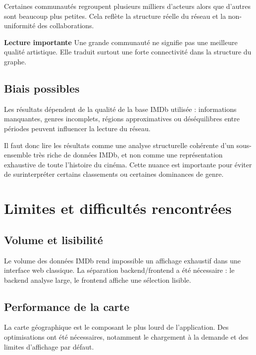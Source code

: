 \documentclass[a4paper,12pt]{article}
\begin{document}
Certaines communautés regroupent plusieurs milliers d'acteurs alors que d'autres sont beaucoup plus petites. Cela reflète la structure réelle du réseau et la non-uniformité des collaborations.

\begin{tcolorbox}[infobox]
\textbf{Lecture importante}
Une grande communauté ne signifie pas une meilleure qualité artistique. Elle traduit surtout une forte connectivité dans la structure du graphe.
\end{tcolorbox}

\subsection{Biais possibles}

Les résultats dépendent de la qualité de la base IMDb utilisée : informations manquantes, genres incomplets, régions approximatives ou déséquilibres entre périodes peuvent influencer la lecture du réseau.

Il faut donc lire les résultats comme une analyse structurelle cohérente d'un sous-ensemble très riche de données IMDb, et non comme une représentation exhaustive de toute l'histoire du cinéma. Cette nuance est importante pour éviter de surinterpréter certains classements ou certaines dominances de genre.

\newpage
\section{Limites et difficultés rencontrées}

\subsection{Volume et lisibilité}

Le volume des données IMDb rend impossible un affichage exhaustif dans une interface web classique. La séparation backend/frontend a été nécessaire : le backend analyse large, le frontend affiche une sélection lisible.

\subsection{Performance de la carte}

La carte géographique est le composant le plus lourd de l'application. Des optimisations ont été nécessaires, notamment le chargement à la demande et des limites d'affichage par défaut.
\end{document}
